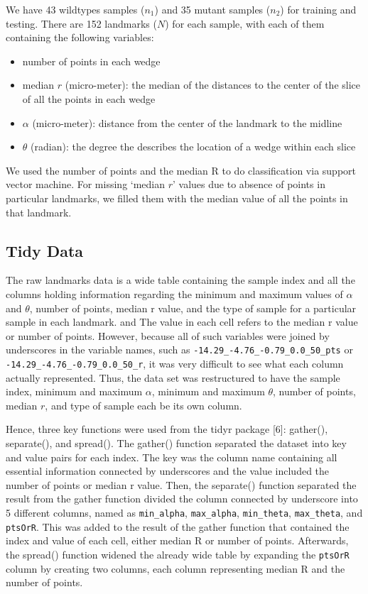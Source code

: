 \documentclass[10pt,letterpaper]{article}
\providecommand{\tightlist}{%
  \setlength{\itemsep}{0pt}\setlength{\parskip}{0pt}}
\begin{document}
We have 43 wildtypes samples (\(n_1\)) and 35 mutant samples (\(n_2\))
for training and testing. There are 152 landmarks (\(N\)) for each
sample, with each of them containing the following variables:

\begin{itemize}
\tightlist
\item
  number of points in each wedge
\item
  median \(r\) (micro-meter): the median of the distances to the center
  of the slice of all the points in each wedge
\item
  \(\alpha\) (micro-meter): distance from the center of the landmark to
  the midline
\item
  \(\theta\) (radian): the degree the describes the location of a wedge
  within each slice
\end{itemize}

We used the number of points and the median R to do classification via
support vector machine. For missing `median \(r\)' values due to absence
of points in particular landmarks, we filled them with the median value
of all the points in that landmark.

\subsection{Tidy Data}\label{tidy-data}

The raw landmarks data is a wide table containing the sample index and
all the columns holding information regarding the minimum and maximum
values of \(\alpha\) and \(\theta\), number of points, median r value,
and the type of sample for a particular sample in each landmark. and The
value in each cell refers to the median r value or number of points.
However, because all of such variables were joined by underscores in the
variable names, such as \texttt{-14.29\_-4.76\_-0.79\_0.0\_50\_pts} or
\texttt{-14.29\_-4.76\_-0.79\_0.0\_50\_r}, it was very difficult to see
what each column actually represented. Thus, the data set was
restructured to have the sample index, minimum and maximum \(\alpha\),
minimum and maximum \(\theta\), number of points, median \(r\), and type
of sample each be its own column.

Hence, three key functions were used from the tidyr package {[}6{]}:
gather(), separate(), and spread(). The gather() function separated the
dataset into key and value pairs for each index. The key was the column
name containing all essential information connected by underscores and
the value included the number of points or median r value. Then, the
separate() function separated the result from the gather function
divided the column connected by underscore into 5 different columns,
named as \texttt{min\_alpha}, \texttt{max\_alpha}, \texttt{min\_theta},
\texttt{max\_theta}, and \texttt{ptsOrR}. This was added to the result
of the gather function that contained the index and value of each cell,
either median R or number of points. Afterwards, the spread() function
widened the already wide table by expanding the \texttt{ptsOrR} column
by creating two columns, each column representing median R and the
number of points.
\end{document}
